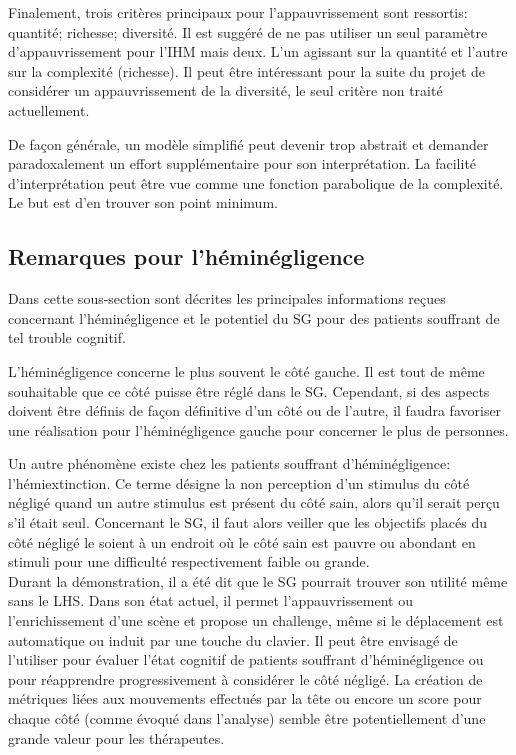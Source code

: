 		Finalement, trois critères principaux pour l'appauvrissement sont ressortis: quantité; richesse; diversité. Il est suggéré de ne pas utiliser un seul paramètre d'appauvrissement pour l'IHM mais deux. L'un agissant sur la quantité et l'autre sur la complexité (richesse). Il peut être intéressant pour la suite du projet de considérer un appauvrissement de la diversité, le seul critère non traité actuellement.
		
		De façon générale, un modèle simplifié peut devenir trop abstrait et demander paradoxalement un effort supplémentaire pour son interprétation. La facilité d'interprétation peut être vue comme une fonction parabolique de la complexité. Le but est d'en trouver son point minimum.		
	
	\subsection*{Remarques pour l'héminégligence}
		Dans cette sous-section sont décrites les principales informations reçues concernant l'héminégligence et le potentiel du SG pour des patients souffrant de tel trouble cognitif.
		
		L'héminégligence concerne le plus souvent le côté gauche. Il est tout de même souhaitable que ce côté puisse être réglé dans le SG. Cependant, si des aspects doivent être définis de façon définitive d'un côté ou de l'autre, il faudra favoriser une réalisation pour l’héminégligence gauche pour concerner le plus de personnes.
		
		Un autre phénomène existe chez les patients souffrant d'héminégligence: l'hémiextinction. Ce terme désigne la non perception d'un stimulus du côté négligé quand un autre stimulus est présent du côté sain, alors qu'il serait perçu s'il était seul. Concernant le SG, il faut alors veiller que les objectifs placés du côté négligé le soient à un endroit où le côté sain est pauvre ou abondant en stimuli pour une difficulté respectivement faible ou grande.
		\\		
		
		Durant la démonstration, il a été dit que le SG pourrait trouver son utilité même sans le LHS. Dans son état actuel, il permet l'appauvrissement ou l'enrichissement d'une scène et propose un challenge, même si le déplacement est automatique ou induit par une touche du clavier. Il peut être envisagé de l'utiliser pour évaluer l'état cognitif de patients souffrant d'héminégligence ou pour réapprendre progressivement à considérer le côté négligé. La création de métriques liées aux mouvements effectués par la tête ou encore un score pour chaque côté (comme évoqué dans l'analyse) semble être potentiellement d'une grande valeur pour les thérapeutes.
		

